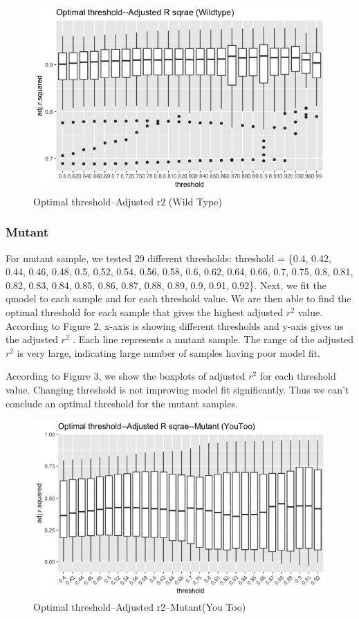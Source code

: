 \documentclass[10pt,letterpaper]{article}
\begin{document}
\begin{figure}[H]
\includegraphics[width=0.9\linewidth]{visualization_paper/threshold_boxplot_wt} \caption{Optimal threshold--Adjusted r2 (Wild Type)}\label{fig:Figure2}
\end{figure}

\subsubsection{Mutant}\label{mutant}

For mutant sample, we tested 29 different thresholds: threshold = \{0.4,
0.42, 0.44, 0.46, 0.48, 0.5, 0.52, 0.54, 0.56, 0.58, 0.6, 0.62, 0.64,
0.66, 0.7, 0.75, 0.8, 0.81, 0.82, 0.83, 0.84, 0.85, 0.86, 0.87, 0.88,
0.89, 0.9, 0.91, 0.92\}. Next, we fit the qmodel to each sample and for
each threshold value. We are then able to find the optimal threshold for
each sample that gives the highest adjusted \(r^2\) value. According to
Figure 2, x-axis is showing different thresholds and y-axis gives us the
adjusted \(r^2\) . Each line represents a mutant sample. The range of
the adjusted \(r^2\) is very large, indicating large number of samples
having poor model fit.

According to Figure 3, we show the boxplots of adjusted \(r^2\) for each
threshold value. Changing threshold is not improving model fit
significantly. Thus we can't conclude an optimal threshold for the
mutant samples.

\begin{figure}[H]
\includegraphics[width=0.9\linewidth]{visualization_paper/threshold_boxplot_yt} \caption{Optimal threshold--Adjusted r2--Mutant(You Too)}\label{fig:Figure3}
\end{figure}
\end{document}
